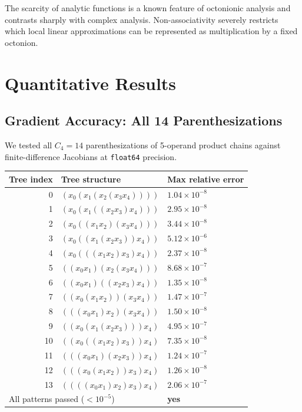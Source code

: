\documentclass[11pt]{article}
\begin{document}
The scarcity of analytic functions is a known feature of octonionic analysis and
contrasts sharply with complex analysis.  Non-associativity severely restricts
which local linear approximations can be represented as multiplication by a fixed
octonion.

\section{Quantitative Results}
\label{sec:results}

\subsection{Gradient Accuracy: All 14 Parenthesizations}

We tested all $C_4 = 14$ parenthesizations of 5-operand product chains against
finite-difference Jacobians at \texttt{float64} precision.

\begin{center}
\begin{tabular}{rll}
  \toprule
  Tree index & Tree structure & Max relative error \\
  \midrule
  0  & $(x_0(x_1(x_2(x_3 x_4))))$               & $1.04 \times 10^{-8}$ \\
  1  & $(x_0(x_1((x_2 x_3)x_4)))$                & $2.95 \times 10^{-8}$ \\
  2  & $(x_0((x_1 x_2)(x_3 x_4)))$               & $3.44 \times 10^{-8}$ \\
  3  & $(x_0((x_1(x_2 x_3))x_4))$                & $5.12 \times 10^{-6}$ \\
  4  & $(x_0(((x_1 x_2)x_3)x_4))$                & $2.37 \times 10^{-8}$ \\
  5  & $((x_0 x_1)(x_2(x_3 x_4)))$               & $8.68 \times 10^{-7}$ \\
  6  & $((x_0 x_1)((x_2 x_3)x_4))$               & $1.35 \times 10^{-8}$ \\
  7  & $((x_0(x_1 x_2))(x_3 x_4))$               & $1.47 \times 10^{-7}$ \\
  8  & $(((x_0 x_1)x_2)(x_3 x_4))$               & $1.50 \times 10^{-8}$ \\
  9  & $((x_0(x_1(x_2 x_3)))x_4)$                & $4.95 \times 10^{-7}$ \\
  10 & $((x_0((x_1 x_2)x_3))x_4)$                & $7.35 \times 10^{-8}$ \\
  11 & $(((x_0 x_1)(x_2 x_3))x_4)$               & $1.24 \times 10^{-7}$ \\
  12 & $(((x_0(x_1 x_2))x_3)x_4)$                & $1.26 \times 10^{-8}$ \\
  13 & $((((x_0 x_1)x_2)x_3)x_4)$                & $2.06 \times 10^{-7}$ \\
  \midrule
  \multicolumn{2}{l}{All patterns passed ($<10^{-5}$)} & \textbf{yes} \\
  \bottomrule
\end{tabular}
\end{center}
\end{document}
